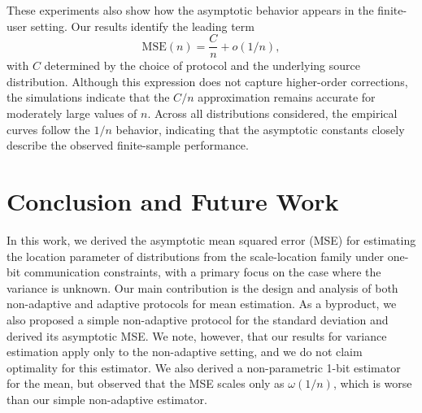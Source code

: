 \documentclass[10pt]{article} %
\theoremstyle{plain}
\theoremstyle{definition}
\theoremstyle{remark}
\newcommand{\rkcomment}[1]{\textcolor{blue}{RK: #1}}
\begin{document}
\begin{remark}
These experiments also show how the asymptotic behavior appears in the finite-user setting. Our results identify the leading term
\[
\mathrm{MSE}(n)=\frac{C}{n}+o(1/n),
\]
with $C$ determined by the choice of protocol and the underlying source distribution. Although this expression does not capture higher-order corrections, the simulations indicate that the $C/n$ approximation remains accurate for moderately large values of $n$.  
Across all distributions considered, the empirical curves follow the  $1/n$ behavior, indicating that the asymptotic constants closely describe the observed finite-sample performance.
\end{remark}


\noindent

\section{Conclusion and Future Work}
In this work, we derived the asymptotic mean squared error (MSE) for estimating the location parameter of distributions from the scale-location family under one-bit communication constraints, with a primary focus on the case where the variance is unknown. Our main contribution is the design and analysis of both non-adaptive and adaptive protocols for mean estimation. As a byproduct, we also proposed a simple non-adaptive protocol for the standard deviation and derived its asymptotic MSE. We note, however, that our results for variance estimation apply only to the non-adaptive setting, and we do not claim optimality for this estimator. We also derived a non-parametric 1-bit estimator for the mean, but observed that the MSE scales only as $\omega(1/n)$, which is worse than our simple non-adaptive estimator.
\end{document}
